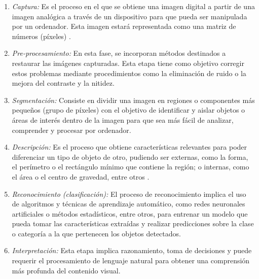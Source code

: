 
\begin{enumerate}
 \item \textit{Captura:} %
Es el proceso en el que se obtiene una imagen digital a partir de una imagen analógica a través de un dispositivo para que pueda ser manipulada por un ordenador. Esta imagen estará representada como una matriz de números (píxeles) \cite{Martinez22}.
 
 \item \textit{Pre-procesamiento:} En esta fase, se incorporan métodos destinados a restaurar las imágenes capturadas.%
Esta etapa tiene como objetivo corregir estos problemas mediante procedimientos como la eliminación de ruido o la mejora del contraste y la nitidez.
 
 \item \textit{Segmentación:} %
Consiste en dividir una imagen en regiones o componentes más pequeños (grupo de píxeles) con el objetivo de identificar y aislar objetos o áreas de interés dentro de la imagen %
para que sea más fácil de analizar, comprender y procesar por ordenador.

 \item \textit{Descripción:} Es el proceso que obtiene características relevantes para poder diferenciar un tipo de objeto de otro, pudiendo ser externas, como la forma, el perímetro o el rectángulo mínimo que contiene la región; o internas, como el área o el centro de gravedad, entre otros \cite{Santillan15}. 
 
 \item \textit{Reconocimiento (clasificación):} %
El proceso de reconocimiento implica el uso de algoritmos y técnicas de aprendizaje automático, como redes neuronales artificiales o métodos estadísticos, entre otros, para entrenar un modelo que pueda tomar las características extraídas y realizar predicciones sobre la clase o categoría a la que pertenecen los objetos detectados.
 
 \item \textit{Interpretación:} %
Esta etapa implica razonamiento, toma de decisiones y puede requerir el procesamiento de lenguaje natural para obtener una comprensión más profunda del contenido visual.
 
\end{enumerate}


